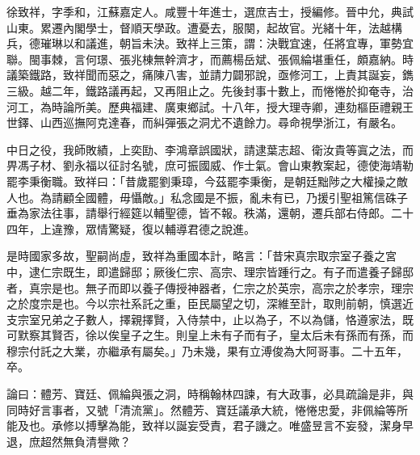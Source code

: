 \begin{pinyinscope}
徐致祥，字季和，江蘇嘉定人。咸豐十年進士，選庶吉士，授編修。晉中允，典試山東。累遷內閣學士，督順天學政。遭憂去，服闋，起故官。光緒十年，法越構兵，德璀琳以和議進，朝旨未決。致祥上三策，謂：決戰宜速，任將宜專，軍勢宜聯。閩事棘，言何璟、張兆棟無幹濟才，而薦楊岳斌、張佩綸堪重任，頗嘉納。時議築鐵路，致祥聞而惡之，痛陳八害，並請力闢邪說，亟修河工，上責其誕妄，鐫三級。越二年，鐵路議再起，又再阻止之。先後封事十數上，而惓惓於抑奄寺，治河工，為時論所美。歷典福建、廣東鄉試。十八年，授大理寺卿，連劾樞臣禮親王世鐸、山西巡撫阿克達春，而糾彈張之洞尤不遺餘力。尋命視學浙江，有嚴名。

中日之役，我師敗績，上奕劻、李鴻章誤國狀，請逮葉志超、衛汝貴等寘之法，而畀馮子材、劉永福以征討名號，庶可振國威、作士氣。會山東教案起，德使海靖勒罷李秉衡職。致祥曰：「昔歲罷劉秉璋，今茲罷李秉衡，是朝廷黜陟之大權操之敵人也。為請顧全國體，毋懾敵。」私念國是不振，亂未有已，乃援引聖祖篤信硃子垂為家法往事，請舉行經筵以輔聖德，皆不報。秩滿，還朝，遷兵部右侍郎。二十四年，上違豫，眾情驚疑，復以輔導君德之說進。

是時國家多故，聖嗣尚虛，致祥為重國本計，略言：「昔宋真宗取宗室子養之宮中，逮仁宗既生，即遣歸邸；厥後仁宗、高宗、理宗皆踵行之。有子而遣養子歸邸者，真宗是也。無子而即以養子傳授神器者，仁宗之於英宗，高宗之於孝宗，理宗之於度宗是也。今以宗社系託之重，臣民屬望之切，深維至計，取則前朝，慎選近支宗室兄弟之子數人，擇親擇賢，入侍禁中，止以為子，不以為儲，恪遵家法，既可默察其賢否，徐以俟皇子之生。則皇上未有子而有子，皇太后未有孫而有孫，而穆宗付託之大業，亦繼承有屬矣。」乃未幾，果有立溥俊為大阿哥事。二十五年，卒。

論曰：體芳、寶廷、佩綸與張之洞，時稱翰林四諫，有大政事，必具疏論是非，與同時好言事者，又號「清流黨」。然體芳、寶廷議承大統，惓惓忠愛，非佩綸等所能及也。承修以搏擊為能，致祥以誕妄受責，君子譏之。唯盛昱言不妄發，潔身早退，庶超然無負清譽歟？


\end{pinyinscope}